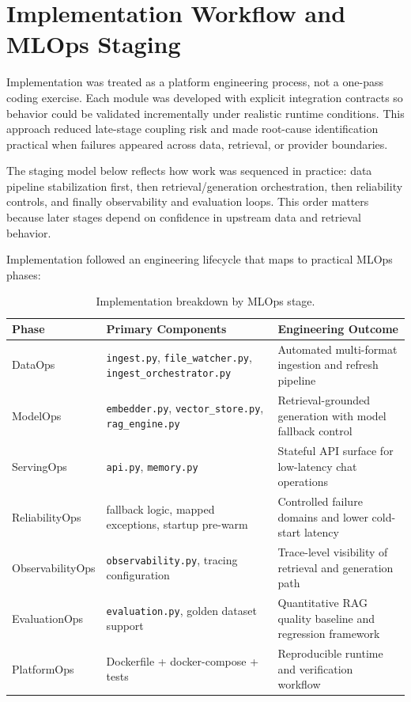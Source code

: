 \documentclass[12pt,letterpaper]{report}
\begin{document}
\section{Implementation Workflow and MLOps Staging}
Implementation was treated as a platform engineering process, not a one-pass coding exercise. Each module was developed with explicit integration contracts so behavior could be validated incrementally under realistic runtime conditions. This approach reduced late-stage coupling risk and made root-cause identification practical when failures appeared across data, retrieval, or provider boundaries.

The staging model below reflects how work was sequenced in practice: data pipeline stabilization first, then retrieval/generation orchestration, then reliability controls, and finally observability and evaluation loops. This order matters because later stages depend on confidence in upstream data and retrieval behavior.

Implementation followed an engineering lifecycle that maps to practical MLOps phases:
\begin{table}[h]
\centering
\begin{tabular}{p{}p{}p{}}
\hline
\textbf{Phase} & \textbf{Primary Components} & \textbf{Engineering Outcome} \\
\hline
DataOps & \texttt{ingest.py}, \texttt{file\_watcher.py}, \texttt{ingest\_orchestrator.py} & Automated multi-format ingestion and refresh pipeline \\
ModelOps & \texttt{embedder.py}, \texttt{vector\_store.py}, \texttt{rag\_engine.py} & Retrieval-grounded generation with model fallback control \\
ServingOps & \texttt{api.py}, \texttt{memory.py} & Stateful API surface for low-latency chat operations \\
ReliabilityOps & fallback logic, mapped exceptions, startup pre-warm & Controlled failure domains and lower cold-start latency \\
ObservabilityOps & \texttt{observability.py}, tracing configuration & Trace-level visibility of retrieval and generation path \\
EvaluationOps & \texttt{evaluation.py}, golden dataset support & Quantitative RAG quality baseline and regression framework \\
PlatformOps & Dockerfile + docker-compose + tests & Reproducible runtime and verification workflow \\
\hline
\end{tabular}
\caption{Implementation breakdown by MLOps stage.}
\end{table}
\end{document}
